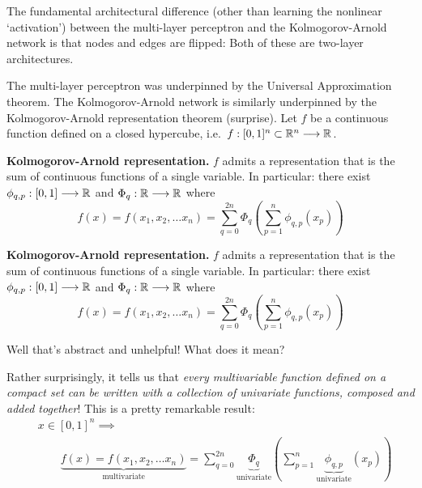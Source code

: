 \begin{frame}
    The fundamental architectural difference (other than learning the nonlinear
    `activation') between the multi-layer perceptron and the Kolmogorov-Arnold
    network is that nodes and edges are flipped:
    Both of these are two-layer architectures. 
\end{frame}

\begin{frame}
    The multi-layer perceptron was underpinned by the Universal Approximation theorem. The Kolmogorov-Arnold network is
    similarly underpinned by the Kolmogorov-Arnold representation theorem (surprise). 
    Let $f$ be a continuous function defined on a closed hypercube, i.e. $f : [0,1]^n \subset \mathbb{R}^n \longrightarrow \mathbb{R}$.
    \begin{theorem}
        \textbf{Kolmogorov-Arnold representation.} $f$ admits a representation that is the sum of continuous
        functions of a single variable. In particular: there exist $\phi_{q, p} : [0, 1] \longrightarrow \mathbb{R}$
        and $\Phi_q: \mathbb{R} \longrightarrow \mathbb{R}$ where
        \[
            f(x) = f(x_1, x_2, \ldots x_n) = \sum_{q=0}^{2n} \Phi_q \left(
                \sum_{p=1}^n \phi_{q, p} (x_p)
                \right)
        \]
    \end{theorem}
\end{frame}

\begin{frame}
    \begin{theorem}
        \textbf{Kolmogorov-Arnold representation.} $f$ admits a representation that is the sum of continuous
        functions of a single variable. In particular: there exist $\phi_{q, p} : [0, 1] \longrightarrow \mathbb{R}$
        and $\Phi_q: \mathbb{R} \longrightarrow \mathbb{R}$ where
        \[
            f(x) = f(x_1, x_2, \ldots x_n) = \sum_{q=0}^{2n} \Phi_q \left(
                \sum_{p=1}^n \phi_{q, p} (x_p)
                \right)
        \]
    \end{theorem}
    Well that's abstract and unhelpful! What does it mean?
\end{frame}

\begin{frame}
    Rather surprisingly, it tells us that \textit{every multivariable function defined on a compact set
    can be written with a collection of univariate functions, composed and added together}! This is a pretty 
    remarkable result:
    \begin{align*}
        & x \in [0, 1]^n \implies \\
        & \qquad \underbrace{f(x) = f(x_1, x_2, \ldots x_n)}_{\text{multivariate}}
        = \sum_{q=0}^{2n} \underbrace{\Phi_q}_{\text{univariate}} \left(
            \sum_{p=1}^n \underbrace{\phi_{q, p}}_{\text{univariate}} (x_p)
            \right)
    \end{align*}
\end{frame}

